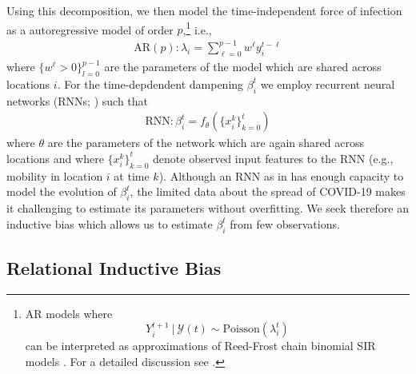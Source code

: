 \documentclass{article}
\newcommand{\Set}[1]{\mathcal{#1}}
\newcommand{\foi}{\lambda}
\begin{document}
Using this decomposition, we then model the time-independent force of infection
as a autoregressive model of order \(p\),\footnote{AR models where \[Y_i^{t+1}\ |\
\Set{Y}(t) \sim \text{Poisson}(\foi_i^t)\] can be interpreted as approximations
of Reed-Frost chain binomial SIR models \citep{abbey1952reedfrost}. For a detailed
discussion see \citep{bauer2018stratified}.} i.e.,
\begin{align}
    \text{AR}(p): \foi_i = \sum_{\ell=0}^{p-1} w^\ell y_i^{t - \ell} \label{eq:foi-ar}
\end{align}
where \(\{w^\ell > 0\}_{l=0}^{p-1}\) are the parameters of the model which are
shared across locations \(i\). For the time-depdendent dampening \(\beta_i^t\) we
employ recurrent neural networks (RNNs;
\cite{elman1990finding,hochreiter1997long,cho2014properties}) such that
\begin{align}
    \text{RNN}: \beta_i^t = f_\theta(\{x_i^k\}_{k=0}^t) \label{eq:rnn}
\end{align}
where \(\theta\) are the parameters of the network which are again shared across
locations and where \(\{x_i^k\}_{k=0}^t\) denote observed input features to the
RNN (e.g., mobility in location \(i\) at time \(k\)). Although an RNN as in
\Cref{eq:rnn} has enough capacity to model the evolution of \(\beta_i^t\), the
limited data about the spread of COVID-19 makes it challenging to estimate its
parameters without overfitting. We seek therefore an inductive bias which allows
us to estimate \(\beta_i^t\) from few observations.


\subsection{Relational Inductive Bias}
\label{sec:orgac99b1b}
\end{document}
